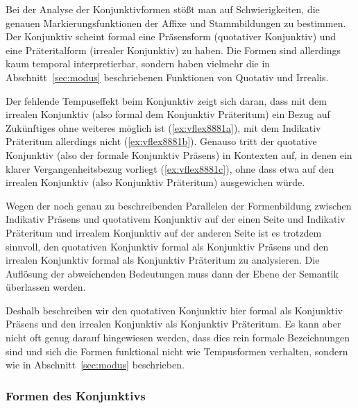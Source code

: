 Bei der Analyse der Konjunktivformen stößt man auf Schwierigkeiten, die genauen Markierungsfunktionen der Affixe und Stammbildungen zu bestimmen.
Der Konjunktiv scheint formal eine Präsensform (quotativer Konjunktiv) und eine Präteritalform (irrealer Konjunktiv) zu haben.
Die Formen sind allerdings kaum temporal interpretierbar, sondern haben vielmehr die in Abschnitt~\ref{sec:modus} beschriebenen Funktionen von Quotativ und Irrealis.

Der fehlende Tempuseffekt beim Konjunktiv zeigt sich \zB daran, dass mit dem irrealen Konjunktiv (also formal dem Konjunktiv Präteritum) ein Bezug auf Zukünftiges ohne weiteres möglich ist (\ref{ex:vflex8881a}), mit dem Indikativ Präteritum allerdings nicht (\ref{ex:vflex8881b}).
Genauso tritt der quotative Konjunktiv (also der formale Konjunktiv Präsens) in Kontexten auf, in denen ein klarer Vergangenheitsbezug vorliegt (\ref{ex:vflex8881c}), ohne dass etwa auf den irrealen Konjunktiv (also Konjunktiv Präteritum) ausgewichen würde.

\begin{exe}
  \ex\label{ex:vflex8881}
  \begin{xlist}
  \end{xlist}
\end{exe}

Wegen der noch genau zu beschreibenden Parallelen der Formenbildung zwischen Indikativ Präsens und quotativem Konjunktiv auf der einen Seite und Indikativ Präteritum und irrealem Konjunktiv auf der anderen Seite ist es trotzdem sinnvoll, den quotativen Konjunktiv formal als Konjunktiv Präsens und den irrealen Konjunktiv formal als Konjunktiv Präteritum zu analysieren.
Die Auflösung der abweichenden Bedeutungen muss dann der Ebene der Semantik überlassen werden.

Deshalb beschreiben wir den quotativen Konjunktiv hier formal als Konjunktiv Präsens und den irrealen Konjunktiv als Konjunktiv Präteritum.
Es kann aber nicht oft genug darauf hingewiesen werden, dass dies rein formale Bezeichnungen sind und sich die Formen funktional nicht wie Tempusformen verhalten, sondern wie in Abschnitt~\ref{sec:modus} beschrieben.

\subsubsection{Formen des Konjunktivs}


